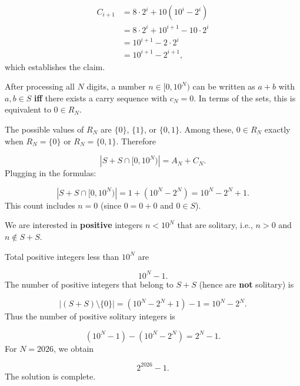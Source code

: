 \[
\begin{aligned}
C_{i+1} &= 8\cdot 2^i + 10(10^i - 2^i) \\
&= 8\cdot 2^i + 10^{i+1} - 10\cdot 2^i \\
&= 10^{i+1} - 2\cdot 2^i \\
&= 10^{i+1} - 2^{i+1},
\end{aligned}
\]
which establishes the claim.\par
{}
After processing all \(N\) digits, a number \(n \in [0,10^N)\) can be written as \(a+b\) with \(a,b\in S\) \textbf{iff} there exists a carry sequence with \(c_N = 0\). In terms of the sets, this is equivalent to \(0 \in R_N\).\par
The possible values of \(R_N\) are \(\{0\}\), \(\{1\}\), or \(\{0,1\}\). Among these, \(0 \in R_N\) exactly when \(R_N = \{0\}\) or \(R_N = \{0,1\}\). Therefore\par
\[
|S+S \cap [0,10^N)| = A_N + C_N.
\]
Plugging in the formulas:\par
\[
|S+S \cap [0,10^N)| = 1 + (10^N - 2^N) = 10^N - 2^N + 1.
\]
This count includes \(n = 0\) (since \(0 = 0+0\) and \(0 \in S\)).\par
{}
We are interested in \textbf{positive} integers \(n < 10^N\) that are solitary, i.e., \(n > 0\) and \(n \notin S+S\).\par
Total positive integers less than \(10^N\) are\par
\[
10^N - 1.
\]
The number of positive integers that belong to \(S+S\) (hence are \textbf{not} solitary) is\par
\[
|(S+S) \setminus \{0\}| = (10^N - 2^N + 1) - 1 = 10^N - 2^N.
\]
Thus the number of positive solitary integers is\par
\[
(10^N - 1) - (10^N - 2^N) = 2^N - 1.
\]
For \(N = 2026\), we obtain\par
\[
\boxed{2^{2026} - 1}.
\]
The solution is complete.\par
\par
